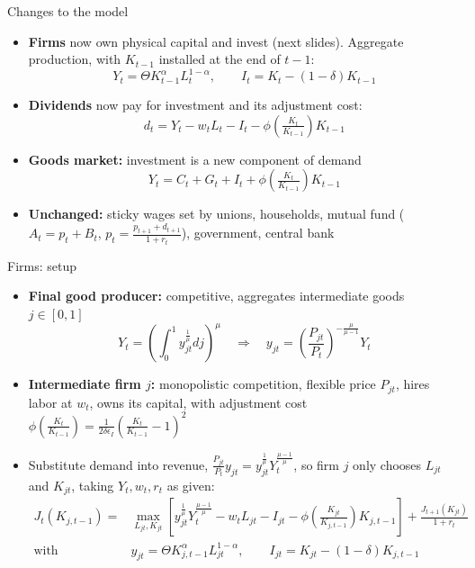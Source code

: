 \documentclass[10pt,english]{beamer}
\begin{document}
%
\begin{frame}{Changes to the model}
\begin{itemize}
\item <+->\textbf{Firms} now own physical capital and invest (next slides). Aggregate production, with $K_{t-1}$ installed at the end of $t-1$:
\[
Y_{t}=\Theta K_{t-1}^{\alpha}L_{t}^{1-\alpha},\qquad I_{t}=K_{t}-(1-\delta)K_{t-1}
\]
\item <+->\textbf{Dividends} now pay for investment and its adjustment cost:
\[
d_{t}=Y_{t}-w_{t}L_{t}-I_{t}-\phi\left(\tfrac{K_{t}}{K_{t-1}}\right)K_{t-1}
\]
\item <+->\textbf{Goods market:} investment is a new component of demand
\[
Y_{t}=C_{t}+G_{t}+I_{t}+\phi\left(\tfrac{K_{t}}{K_{t-1}}\right)K_{t-1}
\]
\item <+->\textbf{Unchanged:} sticky wages set by unions, households, mutual fund ($A_{t}=p_{t}+B_{t}$, $p_{t}=\frac{p_{t+1}+d_{t+1}}{1+r_{t}}$), government, central bank
\end{itemize}
\end{frame}
%
\begin{frame}{Firms: setup}
\vspace{-1mm}
\begin{itemize}
\item <+->\textbf{Final good producer:} competitive, aggregates intermediate goods $j\in[0,1]$
\[
Y_{t}=\left(\int_{0}^{1}y_{jt}^{\frac{1}{\mu}}dj\right)^{\mu}\quad\Rightarrow\quad y_{jt}=\left(\frac{P_{jt}}{P_{t}}\right)^{-\frac{\mu}{\mu-1}}Y_{t}
\]
\item <+->\textbf{Intermediate firm $j$:} monopolistic competition, flexible price $P_{jt}$, hires labor at $w_{t}$, owns its capital, with adjustment cost $\phi\left(\tfrac{K_{t}}{K_{t-1}}\right)=\frac{1}{2\delta\epsilon_{I}}\left(\tfrac{K_{t}}{K_{t-1}}-1\right)^{2}$
\item <+->Substitute demand into revenue, $\frac{P_{jt}}{P_{t}}y_{jt}=y_{jt}^{\frac{1}{\mu}}Y_{t}^{\frac{\mu-1}{\mu}}$, so firm $j$ only chooses $L_{jt}$ and $K_{jt}$, taking $Y_{t},w_{t},r_{t}$ as given:
{\small
\begin{align*}
J_{t}(K_{j,t-1})= & \max_{L_{jt},K_{jt}}\left[y_{jt}^{\frac{1}{\mu}}Y_{t}^{\frac{\mu-1}{\mu}}-w_{t}L_{jt}-I_{jt}-\phi\left(\tfrac{K_{jt}}{K_{j,t-1}}\right)K_{j,t-1}\right] +\frac{J_{t+1}(K_{jt})}{1+r_{t}}\\
\text{with}\quad & y_{jt}=\Theta K_{j,t-1}^{\alpha}L_{jt}^{1-\alpha},\qquad I_{jt}=K_{jt}-(1-\delta)K_{j,t-1}
\end{align*}
}
\end{itemize}
\end{frame}
\end{document}
